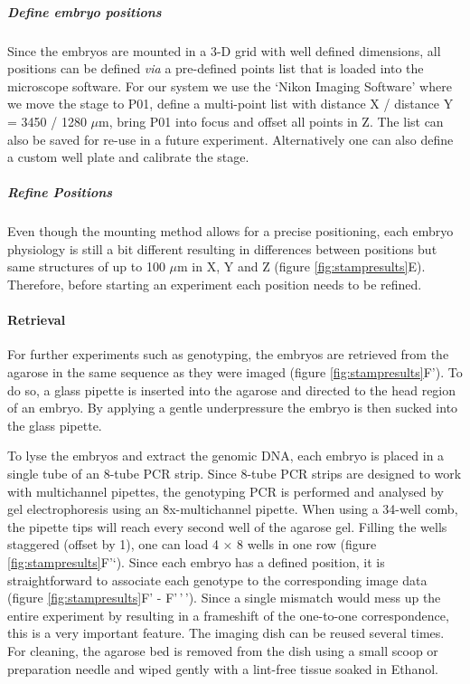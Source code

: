 \documentclass[10pt, b5paper, singlespacinge, twoside]{reedthesis} %
\theoremstyle{definition}
\theoremstyle{definition}
\theoremstyle{definition}
\theoremstyle{remark}
\begin{document}
\hypertarget{define-embryo-positions}{%
\subparagraph{Define embryo positions}\label{define-embryo-positions}}

Since the embryos are mounted in a 3-D grid with well defined dimensions, all positions can be defined \emph{via} a pre-defined points list that is loaded into the microscope software. For our system we use the `Nikon Imaging Software' where we move the stage to P01, define a multi-point list with distance X / distance Y = 3450 / 1280 \(\mu\)m, bring P01 into focus and offset all points in Z. The list can also be saved for re-use in a future experiment. Alternatively one can also define a custom well plate and calibrate the stage.

\hypertarget{refine-positions}{%
\subparagraph{Refine Positions}\label{refine-positions}}

Even though the mounting method allows for a precise positioning, each embryo physiology is still a bit different resulting in differences between positions but same structures of up to 100 \(\mu\)m in X, Y and Z (figure \ref{fig:stampresults}E). Therefore, before starting an experiment each position needs to be refined.

\hypertarget{retrieval}{%
\paragraph{Retrieval}\label{retrieval}}

For further experiments such as genotyping, the embryos are retrieved from the agarose in the same sequence as they were imaged (figure \ref{fig:stampresults}F'). To do so, a glass pipette is inserted into the agarose and directed to the head region of an embryo. By applying a gentle underpressure the embryo is then sucked into the glass pipette.

To lyse the embryos and extract the genomic DNA, each embryo is placed in a single tube of an 8-tube PCR strip. Since 8-tube PCR strips are designed to work with multichannel pipettes, the genotyping PCR is performed and analysed by gel electrophoresis using an 8x-multichannel pipette. When using a 34-well comb, the pipette tips will reach every second well of the agarose gel. Filling the wells staggered (offset by 1), one can load 4 × 8 wells in one row (figure \ref{fig:stampresults}F'`). Since each embryo has a defined position, it is straightforward to associate each genotype to the corresponding image data (figure \ref{fig:stampresults}F' - F'\,'\,'). Since a single mismatch would mess up the entire experiment by resulting in a frameshift of the one-to-one correspondence, this is a very important feature. The imaging dish can be reused several times. For cleaning, the agarose bed is removed from the dish using a small scoop or preparation needle and wiped gently with a lint-free tissue soaked in Ethanol.
\end{document}
